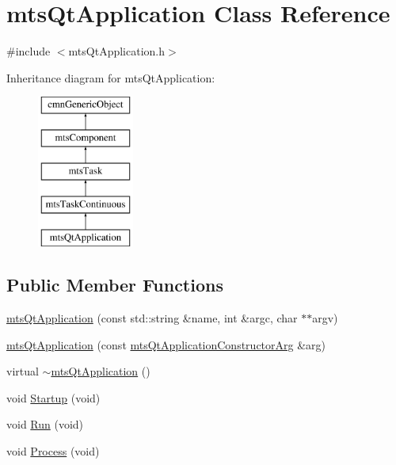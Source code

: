 \hypertarget{classmts_qt_application}{\section{mts\-Qt\-Application Class Reference}
\label{classmts_qt_application}
}


{\ttfamily \#include $<$mts\-Qt\-Application.\-h$>$}

Inheritance diagram for mts\-Qt\-Application\-:\begin{figure}[H]
\begin{center}
\leavevmode
\includegraphics[height=5.000000cm]{da/d94/classmts_qt_application}
\end{center}
\end{figure}
\subsection*{Public Member Functions}
\begin{DoxyCompactItemize}
\item 
\hyperlink{classmts_qt_application_aa749bb5ea3701b5fa2b4ec2b61000bfe}{mts\-Qt\-Application} (const std\-::string \&name, int \&argc, char $\ast$$\ast$argv)
\item 
\hyperlink{classmts_qt_application_a157de745735fb13e8c573ebd7c34e2b6}{mts\-Qt\-Application} (const \hyperlink{classmts_qt_application_constructor_arg}{mts\-Qt\-Application\-Constructor\-Arg} \&arg)
\item 
virtual \hyperlink{classmts_qt_application_a1c0802c2d0c84be2dd54e55948c36966}{$\sim$mts\-Qt\-Application} ()
\item 
void \hyperlink{classmts_qt_application_afecfd8a5506b11a74978a26ad89c5b5d}{Startup} (void)
\item 
void \hyperlink{classmts_qt_application_a31e4e1351cf964b479d96e061f2eebac}{Run} (void)
\item 
void \hyperlink{classmts_qt_application_a8b0b20722f39ae35646bef1f2311ea44}{Process} (void)
\end{DoxyCompactItemize}
